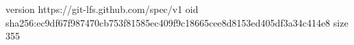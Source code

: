 version https://git-lfs.github.com/spec/v1
oid sha256:ec9df67f987470cb753f81585ec409f9c18665cee8d8153ed405df3a34c414e8
size 355
